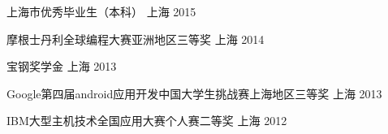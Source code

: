 


\begin{cvhonors}


\cvhonor
{上海市优秀毕业生（本科）} %
{} %
{上海} %
{2015} %

\cvhonor
{摩根士丹利全球编程大赛亚洲地区三等奖} %
{} %
{上海} %
{2014} %

\cvhonor
{宝钢奖学金} %
{} %
{上海} %
{2013} %

\cvhonor
{Google第四届android应用开发中国大学生挑战赛上海地区三等奖} %
{} %
{上海} %
{2013} %

\cvhonor
{IBM大型主机技术全国应用大赛个人赛二等奖} %
{} %
{上海} %
{2012} %


\end{cvhonors}
